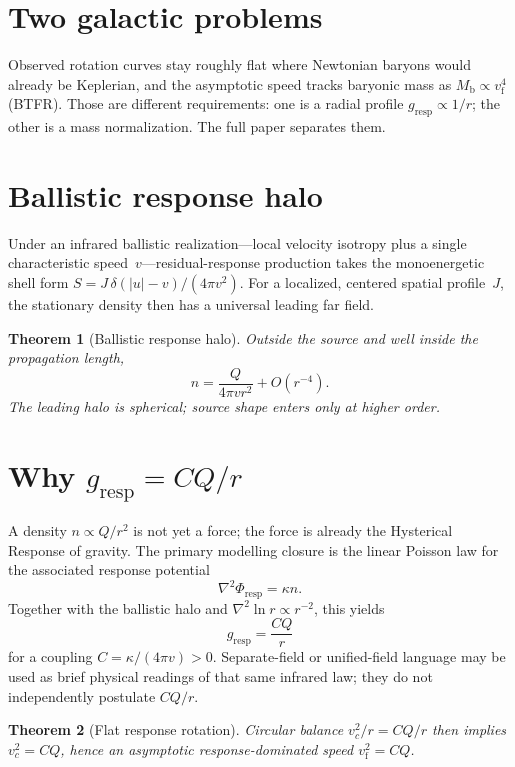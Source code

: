 \documentclass[11pt]{article}
\newtheorem{theorem}{Theorem}[section]
\theoremstyle{definition}
\theoremstyle{remark}
\newcommand{\Mb}{M_{\mathrm{b}}}
\newcommand{\vf}{v_{\mathrm{f}}}
\begin{document}
\section{Two galactic problems}
Observed rotation curves stay roughly flat where Newtonian baryons would already be Keplerian, and the asymptotic speed tracks baryonic mass as $\Mb\propto\vf^{4}$ (BTFR).
Those are different requirements: one is a radial profile $g_{\mathrm{resp}}\propto1/r$; the other is a mass normalization.
The full paper separates them.

\section{Ballistic response halo}
Under an infrared ballistic realization---local velocity isotropy plus a single characteristic speed~$v$---residual-response production takes the monoenergetic shell form $S=J\,\delta(|u|-v)/(4\pi v^{2})$.
For a localized, centered spatial profile~$J$, the stationary density then has a universal leading far field.

\begin{theorem}[Ballistic response halo]
Outside the source and well inside the propagation length,
\[
  n=\frac{Q}{4\pi v r^{2}}+O(r^{-4}).
\]
The leading halo is spherical; source shape enters only at higher order.
\end{theorem}

\section{Why $g_{\mathrm{resp}}=CQ/r$}
A density $n\propto Q/r^{2}$ is not yet a force; the force is already the Hysterical Response of gravity.
The primary modelling closure is the linear Poisson law for the associated response potential
\begin{equation}
  \nabla^{2}\Phi_{\mathrm{resp}}=\kappa n.
\end{equation}
Together with the ballistic halo and $\nabla^{2}\ln r\propto r^{-2}$, this yields
\begin{equation}
  g_{\mathrm{resp}}=\frac{CQ}{r}
\end{equation}
for a coupling $C=\kappa/(4\pi v)>0$.
Separate-field or unified-field language may be used as brief physical readings of that same infrared law; they do not independently postulate $CQ/r$.

\begin{theorem}[Flat response rotation]
Circular balance $v_{c}^{2}/r=CQ/r$ then implies $v_{c}^{2}=CQ$, hence an asymptotic response-dominated speed $\vf^{2}=CQ$.
\end{theorem}
\end{document}
